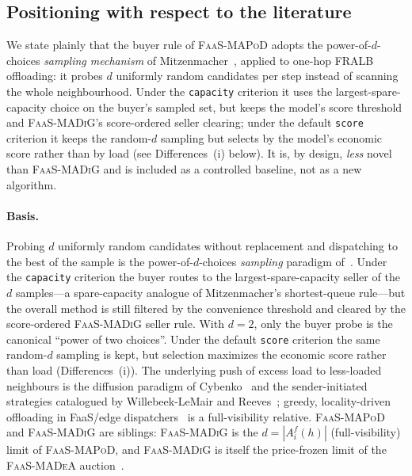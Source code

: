 \subsection{Positioning with respect to the literature}
\label{sec:mapod-related}

We state plainly that the buyer rule of \textsc{FaaS-MAPoD} adopts the
power-of-$d$-choices \emph{sampling mechanism} of
Mitzenmacher~\citep{mitzenmacher2001}, applied to one-hop FRALB offloading:
it probes $d$ uniformly random candidates per step instead of scanning the
whole neighbourhood. Under the \texttt{capacity} criterion it uses the
largest-spare-capacity choice on the buyer's sampled set, but keeps the model's
score threshold and \textsc{FaaS-MADiG}'s score-ordered seller clearing; under
the default \texttt{score} criterion it keeps the random-$d$ sampling but
selects by the model's economic score rather than by load (see
Differences~(i) below). It is, by design, \emph{less} novel than
\textsc{FaaS-MADiG} and is included as a controlled baseline, not as a new
algorithm.

\paragraph{Basis.} Probing $d$ uniformly random candidates without replacement
and dispatching to the best of the sample is the power-of-$d$-choices
\emph{sampling} paradigm of~\citep{mitzenmacher2001}. Under the \texttt{capacity}
criterion the buyer routes to the largest-spare-capacity seller of the $d$
samples---a spare-capacity analogue of Mitzenmacher's shortest-queue rule---but
the overall method is still filtered by the convenience threshold and cleared by
the score-ordered \textsc{FaaS-MADiG} seller rule. With $d=2$, only the buyer
probe is the canonical ``power of two choices''. Under the default
\texttt{score} criterion the same random-$d$ sampling is kept, but selection
maximizes the economic score rather than load (Differences~(i)). The
underlying push of excess load to less-loaded neighbours is the diffusion
paradigm of Cybenko~\citep{cybenko1989} and the sender-initiated strategies
catalogued by Willebeek-LeMair and Reeves~\citep{willebeek1993}; greedy,
locality-driven offloading in FaaS/edge dispatchers~\citep{leechoi2021} is a
full-visibility relative. \textsc{FaaS-MAPoD} and \textsc{FaaS-MADiG} are
siblings: \textsc{FaaS-MADiG} is the $d\!=\!|A_i^f(h)|$ (full-visibility) limit
of \textsc{FaaS-MAPoD}, and \textsc{FaaS-MADiG} is itself the price-frozen limit
of the \textsc{FaaS-MADeA} auction~\citep{bertsekas1988}.

